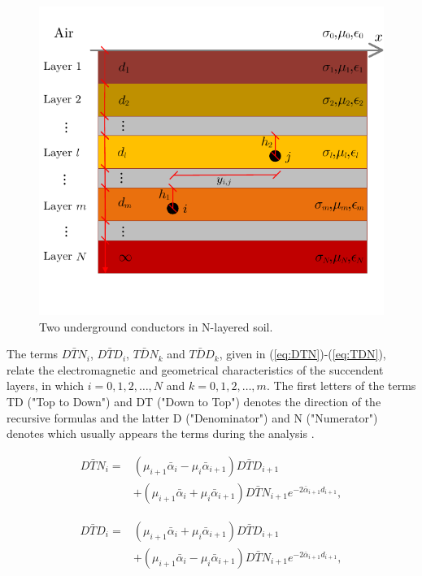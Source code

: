 \documentclass{IEEEtran4PSCC}
\begin{document}
\begin{figure}[hbt]
	\begin{center}
		\includegraphics[width=1\columnwidth]{./fig/multilayered_soil.pdf}
		\caption{Two underground conductors in N-layered soil.}
		\label{fig:NlayeredSoil}
	\end{center}
\end{figure}

The terms $D\bar{T}N_{i}$, $D\bar{T}D_{i}$, $T\bar{D}N_{k}$ and $T\bar{D}D_{k}$, given in (\ref{eq:DTN})-(\ref{eq:TDN}), relate the electromagnetic and geometrical characteristics of the succendent layers, in which $i = 0,1,2,\dots,N$ and $k = 0,1,2,\dots,m$. The first letters of the terms TD ("Top to Down") and DT ("Down to Top") denotes the direction of the recursive formulas and the latter D ("Denominator") and N ("Numerator") denotes which usually appears the terms during the analysis \cite{Tsiamitros2008a}.

\begin{equation}\label{eq:DTN}
	\begin{aligned}
		D\bar{T}N_{i} = {} & (\mu_{i+1}\bar\alpha_{i} - \mu_{i}\bar\alpha_{i+1})D\bar{T}D_{i+1} \\
		& + (\mu_{i+1}\bar\alpha_{i} + \mu_{i}\bar\alpha_{i+1})D\bar{T}N_{i+1}e^{-2\bar\alpha_{i+1}d_{i+1}},
	\end{aligned}
\end{equation}  

\begin{equation}
	\begin{aligned}
		D\bar{T}D_{i} = {} & (\mu_{i+1}\bar\alpha_{i} + \mu_{i}\bar\alpha_{i+1})D\bar{T}D_{i+1} \\
		& + (\mu_{i+1}\bar\alpha_{i} - \mu_{i}\bar\alpha_{i+1})D\bar{T}N_{i+1}e^{-2\bar\alpha_{i+1}d_{i+1}},
	\end{aligned}
\end{equation} 
\end{document}
